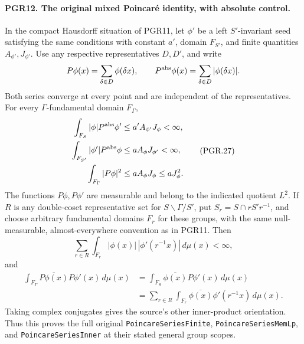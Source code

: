 \documentclass[11pt,a4paper]{article}
\numberwithin{equation}{section}
\theoremstyle{remark}\newtheorem{remark}[theorem]{Remark}
\begin{document}
\paragraph{PGR12. The original mixed Poincar\'e identity, with absolute control.}
\label{claim:PGR12}
In the compact Hausdorff situation of PGR11, let \(\phi'\) be a
left \(S'\)-invariant seed satisfying the same conditions with
constant \(a'\), domain \(F_{S'}\), and finite quantities
\(A_{\phi'},J_{\phi'}\).  Use any respective representatives
\(D,D'\), and write
\[
 P\phi(x)=\sum_{\delta\in D}\phi(\delta x),\qquad
 P^{\rm abs}\phi(x)=\sum_{\delta\in D}|\phi(\delta x)|.
\]
Both series converge at every point and are independent of the
representatives.  For every \(\Gamma\)-fundamental domain
\(F_\Gamma\),
\[
 \begin{split}
 \int_{F_S}|\phi|P^{\rm abs}\phi'
       &\leq a'A_{\phi'}J_\phi<\infty,\\
 \int_{F_{S'}}|\phi'|P^{\rm abs}\phi
       &\leq aA_\phi J_{\phi'}<\infty,\\
 \int_{F_\Gamma}|P\phi|^2
       &\leq a A_\phi J_\phi\leq aJ_\phi^2.
 \end{split}
\tag{PGR.27}
\]
The functions \(P\phi,P\phi'\) are measurable and belong to
the indicated quotient \(L^2\).  If \(R\) is any double-coset
representative set for \(S\backslash\Gamma/S'\), put
\(S_r=S\cap rS'r^{-1}\), and choose arbitrary fundamental
domains \(F_r\) for these groups, with the same null-measurable,
almost-everywhere convention as in PGR11.  Then
\[
 \sum_{r\in R}\int_{F_r}|\phi(x)|\,|\phi'(r^{-1}x)|\,d\mu(x)
                                                   <\infty,
\tag{PGR.28}
\]
and
\[
 \begin{split}
 \int_{F_\Gamma}\overline{P\phi(x)}P\phi'(x)\,d\mu(x)
   &=\int_{F_S}\overline{\phi(x)}P\phi'(x)\,d\mu(x)\\
   &=\sum_{r\in R}\int_{F_r}
          \overline{\phi(x)}\phi'(r^{-1}x)\,d\mu(x).
 \end{split}
\tag{PGR.29}
\]
Taking complex conjugates gives the source's other inner-product
orientation.  Thus this proves the full original
\texttt{Poincare\allowbreak Series\allowbreak Finite}, \texttt{Poincare\allowbreak Series\allowbreak Mem\allowbreak Lp}, and
\texttt{Poincare\allowbreak Series\allowbreak Inner} at their stated general group scopes.
\end{document}
